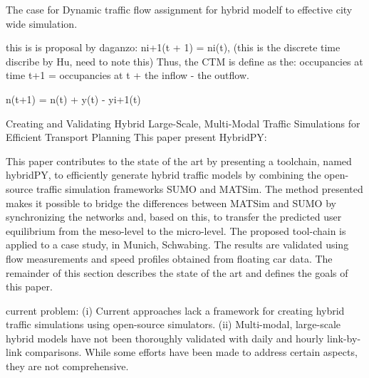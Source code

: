\begin{bibunit}[plainnat]
The case for Dynamic traffic flow assignment for hybrid modelf to effective city wide simulation. 

this is is proposal by daganzo: ni+1(t + 1) = ni(t),   (this is the discrete time discribe by Hu, need to note this)
Thus, the CTM is define as the:
occupancies at time t+1  = occupancies at t + the inflow - the outflow. 

n(t+1)  = n(t) + y(t) - yi+1(t)




Creating and Validating Hybrid Large-Scale, Multi-Modal Traffic
Simulations for Efficient Transport Planning
This paper present HybridPY:

This paper contributes to the state of the art by presenting a toolchain, named hybridPY,
to efficiently generate hybrid traffic models by combining the open-source traffic
simulation frameworks SUMO and MATSim. The method presented makes it possible
to bridge the differences between MATSim and SUMO by synchronizing the networks
and, based on this, to transfer the predicted user equilibrium from the meso-level to the
micro-level. The proposed tool-chain is applied to a case study, in Munich, Schwabing. The
results are validated using flow measurements and speed profiles obtained from floating
car data. The remainder of this section describes the state of the art and defines the goals of
this paper.

current problem: (i) Current approaches lack a framework for creating hybrid traffic simulations
using open-source simulators.
(ii) Multi-modal, large-scale
hybrid models have not been thoroughly validated with daily and hourly link-by-link
comparisons. While some efforts have been made to address certain aspects, they are not
comprehensive.
\fi



\end{bibunit}
